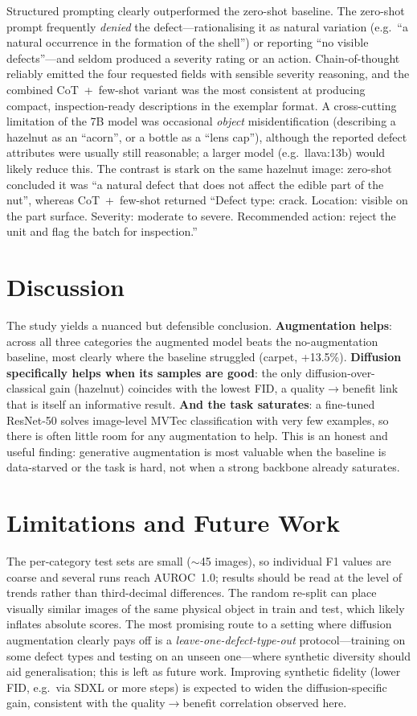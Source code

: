 \documentclass[11pt]{article}
\begin{document}
Structured prompting clearly outperformed the zero-shot baseline. The zero-shot
prompt frequently \emph{denied} the defect---rationalising it as natural
variation (e.g.\ ``a natural occurrence in the formation of the shell'') or
reporting ``no visible defects''---and seldom produced a severity rating or an
action. Chain-of-thought reliably emitted the four requested fields with
sensible severity reasoning, and the combined CoT~+~few-shot variant was the most
consistent at producing compact, inspection-ready descriptions in the exemplar
format. A cross-cutting limitation of the 7B model was occasional \emph{object}
misidentification (describing a hazelnut as an ``acorn'', or a bottle as a
``lens cap''), although the reported defect attributes were usually still
reasonable; a larger model (e.g.\ llava:13b) would likely reduce this. The
contrast is stark on the same hazelnut image: zero-shot concluded it was ``a
natural defect that does not affect the edible part of the nut'', whereas
CoT~+~few-shot returned ``Defect type: crack. Location: visible on the part
surface. Severity: moderate to severe. Recommended action: reject the unit and
flag the batch for inspection.''

\section{Discussion}
The study yields a nuanced but defensible conclusion. \textbf{Augmentation
helps}: across all three categories the augmented model beats the no-augmentation
baseline, most clearly where the baseline struggled (carpet, +13.5\%).
\textbf{Diffusion specifically helps when its samples are good}: the only
diffusion-over-classical gain (hazelnut) coincides with the lowest FID, a
quality$\rightarrow$benefit link that is itself an informative result.
\textbf{And the task saturates}: a fine-tuned ResNet-50 solves image-level MVTec
classification with very few examples, so there is often little room for any
augmentation to help. This is an honest and useful finding: generative
augmentation is most valuable when the baseline is data-starved or the task is
hard, not when a strong backbone already saturates.

\section{Limitations and Future Work}
The per-category test sets are small ($\sim$45 images), so individual F1 values
are coarse and several runs reach AUROC~1.0; results should be read at the level
of trends rather than third-decimal differences. The random re-split can place
visually similar images of the same physical object in train and test, which
likely inflates absolute scores. The most promising route to a setting where
diffusion augmentation clearly pays off is a \emph{leave-one-defect-type-out}
protocol---training on some defect types and testing on an unseen one---where
synthetic diversity should aid generalisation; this is left as future work.
Improving synthetic fidelity (lower FID, e.g.\ via SDXL or more steps) is
expected to widen the diffusion-specific gain, consistent with the
quality$\rightarrow$benefit correlation observed here.
\end{document}
